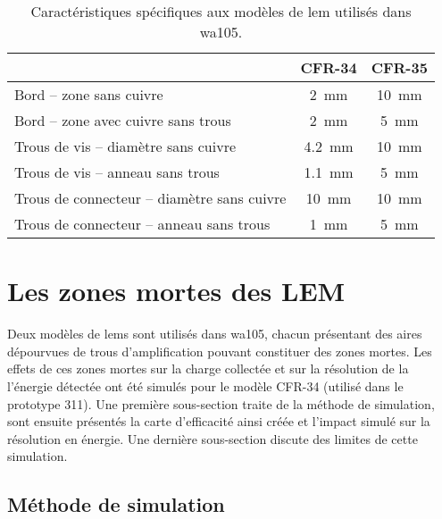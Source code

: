             \begin{table}
                \centering
                \begin{tabular}{|l|c|c|}
                    \hline
                     & CFR-34 & CFR-35\\
                    \hline
                    Bord -- zone sans cuivre & \SI{2}{\milli\meter} & \SI{10}{\milli\meter}\\
                    Bord -- zone avec cuivre sans trous & \SI{2}{\milli\meter} & \SI{5}{\milli\meter}\\
                    Trous de vis -- diamètre sans cuivre & \SI{4.2}{\milli\meter} & \SI{10}{\milli\meter} \\
                    Trous de vis -- anneau sans trous &  \SI{1.1}{\milli\meter} & \SI{5}{\milli\meter} \\
                    Trous de connecteur -- diamètre sans cuivre & \SI{10}{\milli\meter} & \SI{10}{\milli\meter} \\
                    Trous de connecteur -- anneau sans trous & \SI{1}{\milli\meter} & \SI{5}{\milli\meter} \\
                    \hline
                \end{tabular}
                \caption{Caractéristiques spécifiques aux modèles de \gls{lem} utilisés dans \gls{wa105}.\label{tab::lem_diff}}
            \end{table}
            
        
    \section{Les zones mortes des LEM}\label{sec::zones_mortes}
    
        Deux modèles de \glspl{lem} sont utilisés dans \gls{wa105}, chacun présentant des aires dépourvues de trous d'amplification pouvant constituer des zones mortes. Les effets de ces zones mortes sur la charge collectée et sur la résolution de la l'énergie détectée ont été simulés pour le modèle CFR-34 (utilisé dans le prototype 311). Une première sous-section traite de la méthode de simulation, sont ensuite présentés la carte d'efficacité ainsi créée et l'impact simulé sur la résolution en énergie. Une dernière sous-section discute des limites de cette simulation.
        
        \subsection{Méthode de simulation}
        
